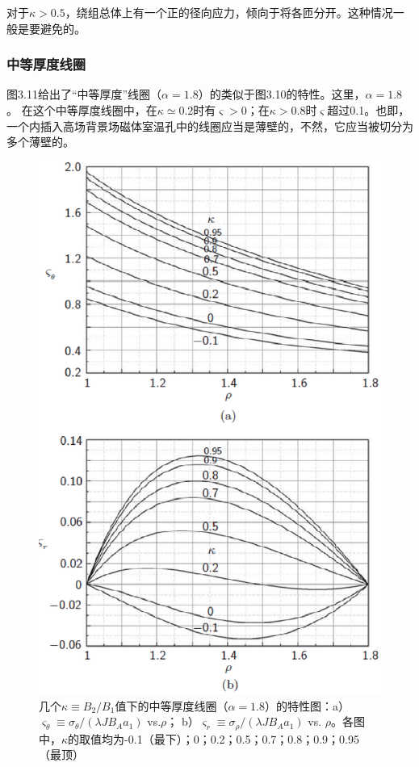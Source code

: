 对于$\kappa>0.5$，绕组总体上有一个正的径向应力，倾向于将各匝分开。这种情况一般是要避免的。

\subsubsection{中等厚度线圈}
图3.11给出了“中等厚度”线圈（$\alpha=1.8$）的类似于图3.10的特性。这里，$\alpha=1.8$。
在这个中等厚度线圈中，在$\kappa\simeq 0.2$时有$\varsigma>0$；在$\kappa> 0.8$时$\varsigma$超过0.1。也即，一个内插入高场背景场磁体室温孔中的线圈应当是薄壁的，不然，它应当被切分为多个薄壁的。

\begin{figure}
  \centering
 \includegraphics[scale=0.7]{chpt3/figs/fig3.11.eps}
  \caption{几个$\kappa\equiv B_2/B_1$值下的中等厚度线圈（$\alpha=1.8$）的特性图：a）$\varsigma_\theta\equiv \sigma_\theta/(\lambda J B_A a_1)$ vs.$\rho$；
  b）$\varsigma_r \equiv \sigma_\rho/(\lambda J B_A a_1)$ vs. $\rho$。各图中，$\kappa$的取值均为-0.1（最下）；0；0.2；0.5；0.7；0.8；0.9；0.95（最顶） }
\end{figure}

